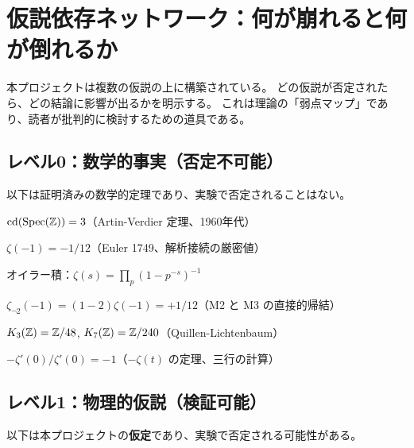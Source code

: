 
\section*{仮説依存ネットワーク：何が崩れると何が倒れるか}

本プロジェクトは複数の仮説の上に構築されている。
どの仮説が否定されたら、どの結論に影響が出るかを明示する。
これは理論の「弱点マップ」であり、読者が批判的に検討するための道具である。

\subsection*{レベル0：数学的事実（否定不可能）}

以下は証明済みの数学的定理であり、実験で否定されることはない。

\begin{tcolorbox}[colback=gray!5,colframe=gray!50!black,title=数学的事実（M1--M6）]
\begin{description}[leftmargin=4em,style=nextline]
\item[M1] $\mathrm{cd}(\operatorname{Spec}(\mathbb{Z})) = 3$（Artin-Verdier 定理、1960年代）
\item[M2] $\zeta(-1) = -1/12$（Euler 1749、解析接続の厳密値）
\item[M3] オイラー積：$\zeta(s) = \prod_p (1-p^{-s})^{-1}$
\item[M4] $\zeta_{\neg 2}(-1) = (1-2)\zeta(-1) = +1/12$（M2 と M3 の直接的帰結）
\item[M5] $K_3(\mathbb{Z}) = \mathbb{Z}/48$, $K_7(\mathbb{Z}) = \mathbb{Z}/240$（Quillen-Lichtenbaum）
\item[M6] $-\zeta'(0)/\zeta'(0) = -1$（$-\zeta(t)$ の定理、三行の計算）
\end{description}
\end{tcolorbox}

\subsection*{レベル1：物理的仮説（検証可能）}

以下は本プロジェクトの\textbf{仮定}であり、実験で否定される可能性がある。

